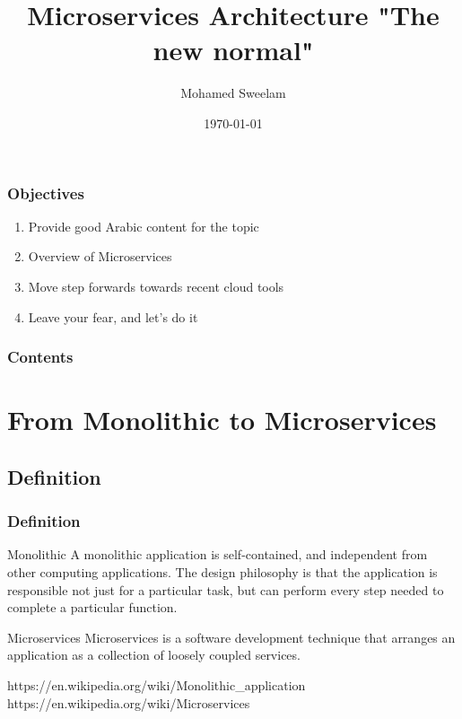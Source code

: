 \documentclass{beamer}
\title[Microservices in Action]{Microservices Architecture "The new normal"} %
\author{Mohamed Sweelam} %
\institute[etisalat UAE] %
{
	Senior Software Engineer \\
	\medskip
	\textit{mohamedsweelam@fci.helwan.edu.eg} %
}
\date{\today} %
\begin{document}
	
	\begin{frame}
	\titlepage
\end{frame}

\begin{frame}
	\frametitle{Objectives} %
		\begin{enumerate}
			\item<1-> \large {Provide good Arabic content for the topic}
			\item<2-> \large {Overview of Microservices}
			\item<3-> \large {Move step forwards towards recent cloud tools}
			\item<4-> \large {Leave your fear, and let's do it}
		\end{enumerate}
\end{frame}

\begin{frame}
\frametitle{Contents} %
	\tableofcontents
\end{frame}


\section{From Monolithic to Microservices}
	\subsection	{Definition} 
		\begin{frame}
			\frametitle{Definition}
				\begin{block}{Monolithic}
					A monolithic application is self-contained, and independent from other computing applications. The design philosophy is that the application is responsible not just for a particular task, but can perform every step needed to complete a particular function.
				\end{block}
			
			\vspace{5mm}
			\begin{block}{Microservices}
				Microservices is a software development technique that arranges an application as a collection of loosely coupled services. 
			\end{block}
			
			\vspace{10mm}
			\tiny{https://en.wikipedia.org/wiki/Monolithic\_application}\\
			\tiny{https://en.wikipedia.org/wiki/Microservices}		
		\end{frame}
	
\end{document}
